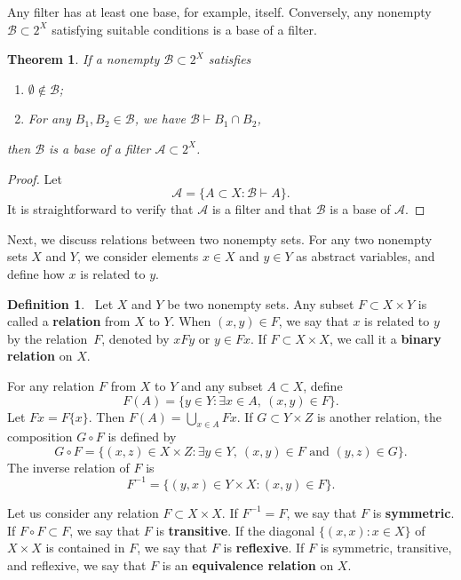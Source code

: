 \documentclass[12pt,a4paper,draft]{article}  %
\newtheorem{theorem}{Theorem}[section]
\theoremstyle{definition}
\newtheorem{definition}{Definition}[section]
\numberwithin{equation}{section}
\begin{document}
Any filter has at least one base, for example, itself. Conversely, any nonempty $\mathcal{B} \subset 2^X$ satisfying suitable conditions is a base of a filter.

\begin{theorem}
    If a nonempty $\mathcal{B} \subset 2^X$ satisfies
    \begin{enumerate}
        \item $\emptyset \notin \mathcal{B}$;
        \item For any $B_1,B_2 \in \mathcal{B}$, we have $\mathcal{B} \vdash B_1 \cap B_2$, 
    \end{enumerate}
    then $\mathcal{B}$ is a base of a filter $\mathcal{A} \subset 2^X$.
\end{theorem}   
\begin{proof}
    Let $$ \mathcal{A} = \{A \subset X: \mathcal{B} \vdash A \}. $$
    It is straightforward to verify that $\mathcal{A}$ is a filter and that $\mathcal{B}$ is a base of $\mathcal{A}$.
\end{proof}

Next, we discuss relations between two nonempty sets.
For any two nonempty sets $X$ and $Y$, we consider elements $x\in X$ and $y\in Y$ as abstract variables, and define how $x$ is related to $y$.
\begin{definition}~\label{def1.3}
    Let $X$ and $Y$ be two nonempty sets. Any subset $F \subset X \times Y$ 
    is called a \textbf{relation} from $X$ to $Y$. When $(x,y) \in F$, we say that
    $x$ is related to $y$ by the relation~$F$, denoted by $xFy$ or $y\in Fx$.
    If $F \subset X \times X$, we call it a \textbf{binary relation} on $X$. 
\end{definition}

For any relation $F$ from $X$ to $Y$ and any subset $A \subset X$, define
$$ F(A) = \{y \in Y: \exists x \in A,\ (x,y) \in F \}. $$
Let $Fx=F\{x\}$. Then $F(A) = \bigcup_{x \in A} Fx$. 
If $G\subset Y \times Z$ is another relation, the composition $G\circ F$ is defined by
$$ G \circ F = \{(x,z) \in X \times Z: \exists y \in Y,\ (x,y) \in F \text{ and } (y,z) \in G \}. $$
The inverse relation of $F$ is
$$ F^{-1} = \{(y,x) \in Y \times X: (x,y) \in F \}. $$

Let us consider any relation $F\subset X\times X$.
If $F^{-1}=F$, we say that $F$ is \textbf{symmetric}. If $F\circ F \subset F$, we say that $F$ is \textbf{transitive}.
If the diagonal $\{(x,x):x\in X\}$ of $X \times X$ is contained in $F$, we say that $F$ is \textbf{reflexive}.
If $F$ is symmetric, transitive, and reflexive, we say that $F$ is an \textbf{equivalence relation} on $X$.
\end{document}
